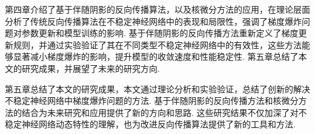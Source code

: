 第四章介绍了基于伴随阴影的反向传播算法，以及核微分方法的应用，在理论层面分析了传统反向传播算法在不稳定神经网络中的表现和局限性，强调了梯度爆炸问题对参数更新和模型训练的影响. 基于伴随阴影的反向传播方法重新定义了梯度更新规则，并通过实验验证了其在不同类型不稳定神经网络中的有效性，这些方法能够显著减小梯度爆炸的影响，提升模型的收敛速度和性能稳定性. 第五章总结了本文的研究成果，并展望了未来的研究方向. 

第五章总结了本文的研究成果，本文通过理论分析和实验验证，总结了创新的解决不稳定神经网络中梯度爆炸问题的方法. 基于伴随阴影的反向传播方法和核微分方法的结合为未来研究和应用提供了新的方向和思路. 这些研究结果不仅加深了对不稳定神经网络动态特性的理解，也为改进反向传播算法提供了新的工具和方法. 